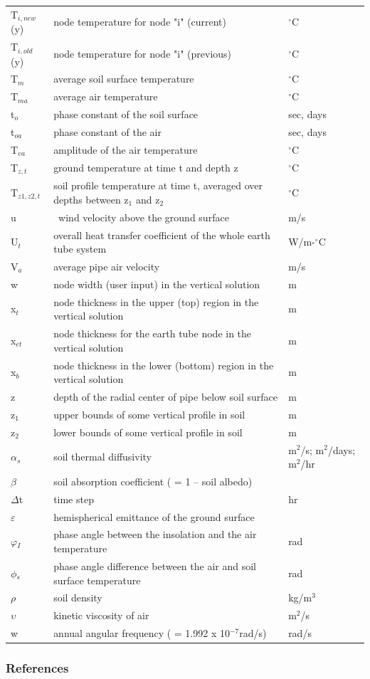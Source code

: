 \begin{longtable}[c]{p{1.5in}p{3.0in}p{1.5in}}
T\(_{i,new}\)(y) & node temperature for node "i" (current) & \(^{\circ}\)C \tabularnewline
T\(_{i,old}\)(y) & node temperature for node "i" (previous) & \(^{\circ}\)C \tabularnewline
T\(_{m}\) & average soil surface temperature & \(^{\circ}\)C \tabularnewline
T\(_{ma}\) & average air temperature & \(^{\circ}\)C \tabularnewline
t\(_{o}\) & phase constant of the soil surface & sec, days \tabularnewline
t\(_{oa}\) & phase constant of the air & sec, days \tabularnewline
T\(_{va}\) & amplitude of the air temperature & \(^{\circ}\)C \tabularnewline
T\(_{z,t}\) & ground temperature at time t and depth z & \(^{\circ}\)C \tabularnewline
T\(_{z1,z2,t}\) & soil profile temperature at time t, averaged over depths between z\(_{1}\) and z\(_{2}\) & \(^{\circ}\)C \tabularnewline
u & ~wind velocity above the ground surface & m/s \tabularnewline
U\(_{t}\) & overall heat transfer coefficient of the whole earth tube system & W/m-\(^{\circ}\)C \tabularnewline
V\(_{a}\) & average pipe air velocity & m/s \tabularnewline
w & node width (user input) in the vertical solution & m \tabularnewline
x\(_{t}\) & node thickness in the upper (top) region in the vertical solution & m \tabularnewline
x\(_{et}\) & node thickness for the earth tube node in the vertical solution & m \tabularnewline
x\(_{b}\) & node thickness in the lower (bottom) region in the vertical solution & m \tabularnewline
z & depth of the radial center of pipe below soil surface & m \tabularnewline
z\(_{1}\) & upper bounds of some vertical profile in soil & m \tabularnewline
z\(_{2}\) & lower bounds of some vertical profile in soil & m \tabularnewline
$\alpha$\(_{s}\) & soil thermal diffusivity & m\(^{2}\)/s; m\(^{2}\)/days; m\(^{2}\)/hr \tabularnewline
$\beta$ & soil absorption coefficient ( = 1 – soil albedo) & ~ \tabularnewline
$\Delta$t & time step & hr \tabularnewline
$\varepsilon$ & hemispherical emittance of the ground surface & ~ \tabularnewline
$\varphi$\(_{I}\) & phase angle between the insolation and the air temperature & rad \tabularnewline
$\phi$\(_{s}\) & phase angle difference between the air and soil surface temperature & rad \tabularnewline
$\rho$ & soil density & kg/m\(^3\) \tabularnewline
$\upsilon$ & kinetic viscosity of air & m\(^{2}\)/s \tabularnewline
w & annual angular frequency ( = 1.992 x 10\(^{-7}\)rad/s) & rad/s \tabularnewline
\bottomrule
\end{longtable}

\subsubsection{References}\label{references-6-001}

